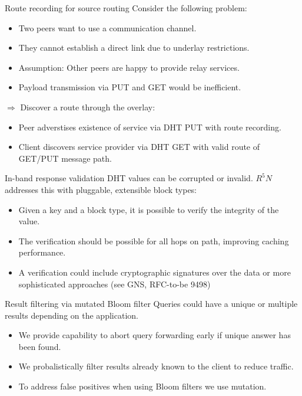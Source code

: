 \documentclass[aspectratio=169]{beamer}
\begin{document}
\begin{frame}{Route recording for source routing}
  Consider the following problem:
  \begin{itemize}
    \item Two peers want to use a communication channel.
    \item They cannot establish a direct link due to underlay restrictions.
    \item Assumption: Other peers are happy to provide relay services.
    \item Payload transmission via PUT and GET would be inefficient.
  \end{itemize}
  $\Rightarrow$ Discover a route through the overlay:

  \begin{itemize}
    \item Peer adverstises existence of service via DHT PUT with route recording.
    \item Client discovers service provider via DHT GET with valid route of GET/PUT message path.
  \end{itemize}
\end{frame}


\begin{frame}{In-band response validation}
  DHT values can be corrupted or invalid. $R^5N$ addresses this with pluggable, extensible block types:
  \begin{itemize}
    \item Given a key and a block type, it is possible to verify the integrity of the value.
    \item The verification should be possible for all hops on path, improving caching performance.
    \item A verification could include cryptographic signatures over the data or more sophisticated approaches (see GNS, RFC-to-be 9498)
  \end{itemize}
\end{frame}

\begin{frame}{Result filtering via mutated Bloom filter}
  Queries could have a unique or multiple results depending on the application.
  \begin{itemize}
    \item We provide capability to abort query forwarding early if unique answer has been found.
    \item We probalistically filter results already known to the client to reduce traffic.
    \item To address false positives when using Bloom filters we use mutation.
  \end{itemize}
\end{frame}
\end{document}
